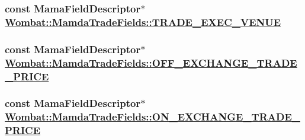 \hypertarget{classWombat_1_1MamdaTradeFields_60b345020cc6a16272a283590829ccfe}{
\subsubsection[TRADE\_\-EXEC\_\-VENUE]{\setlength{\rightskip}{0pt plus 5cm}const Mama\-Field\-Descriptor$\ast$ \hyperlink{classWombat_1_1MamdaTradeFields_60b345020cc6a16272a283590829ccfe}{Wombat::Mamda\-Trade\-Fields::TRADE\_\-EXEC\_\-VENUE}}}
\label{classWombat_1_1MamdaTradeFields_60b345020cc6a16272a283590829ccfe}


\hypertarget{classWombat_1_1MamdaTradeFields_31fcff0fd8d226d47c80b375871d0855}{
\subsubsection[OFF\_\-EXCHANGE\_\-TRADE\_\-PRICE]{\setlength{\rightskip}{0pt plus 5cm}const Mama\-Field\-Descriptor$\ast$ \hyperlink{classWombat_1_1MamdaTradeFields_31fcff0fd8d226d47c80b375871d0855}{Wombat::Mamda\-Trade\-Fields::OFF\_\-EXCHANGE\_\-TRADE\_\-PRICE}}}
\label{classWombat_1_1MamdaTradeFields_31fcff0fd8d226d47c80b375871d0855}


\hypertarget{classWombat_1_1MamdaTradeFields_42d2e222639e61c5b6b03385c42c0f41}{
\subsubsection[ON\_\-EXCHANGE\_\-TRADE\_\-PRICE]{\setlength{\rightskip}{0pt plus 5cm}const Mama\-Field\-Descriptor$\ast$ \hyperlink{classWombat_1_1MamdaTradeFields_42d2e222639e61c5b6b03385c42c0f41}{Wombat::Mamda\-Trade\-Fields::ON\_\-EXCHANGE\_\-TRADE\_\-PRICE}}}
\label{classWombat_1_1MamdaTradeFields_42d2e222639e61c5b6b03385c42c0f41}


